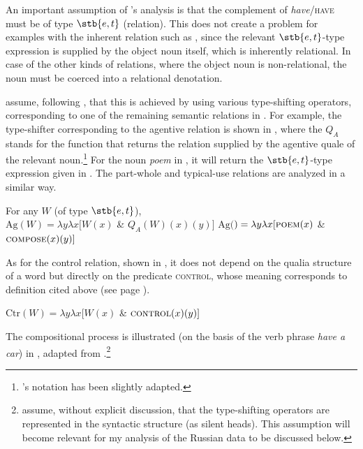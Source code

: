 \documentclass[output=paper,colorlinks,citecolor=brown]{langscibook}
\begin{document}
\noindent An important assumption of \citeauthor{Zaroukian.Beller2013}'s analysis is that the complement of \textit{have}/\textsc{have} must be of type $\stb{e,t}$ (relation). This does not create a problem for examples with the inherent relation such as , since the relevant $\stb{e,t}$-type expression is supplied by the object noun itself, which is inherently relational. In case of the other kinds of relations, where the object noun is non-relational, the noun must be coerced into a relational denotation.

\citet{Zaroukian.Beller2013} assume, following \citet{Vikner.Jensen2002}, that this is achieved by using various type-shifting operators, corresponding to one of the remaining semantic relations in . For example, the type-shifter corresponding to the agentive relation is shown in , where the $Q_A$ stands for the function that returns the relation supplied by the agentive quale of the relevant noun.\footnote{\citeauthor{Vikner.Jensen2002}'s notation has been slightly adapted.} For the noun \textit{poem} in , it will return the $\stb{e,t}$-type expression given in . The part-whole and typical-use relations are analyzed in a similar way.

    \largerpage[-1] %

\ea
\ea For any $W$ (of type $\stb{e,t}$),\\
$\text{Ag}(W) = \lambda y  \lambda x [W(x)$ \& $Q_A (W)(x)(y)]$  \label{agentive-shifter} \hfill
\citep[209]{Vikner.Jensen2002}
\ex $\text{Ag}($$) = \lambda y \lambda x [\textsc{poem}(x)$ \& $\textsc{compose}(x)(y)]$  \label{agentive-shifter-applied}
\z\z

\noindent As for the control relation, shown in , it does not depend on the qualia structure of a word but directly on the predicate \textsc{control}, whose meaning corresponds to  definition cited above (see page \pageref{ViknerJensen-control}).

\ea $\text{Ctr}(W) = \lambda y \lambda x [W(x)$ \& $\textsc{control}(x)(y)]$ \label{control-shifter} \hfill \citep[210]{Vikner.Jensen2002}
\z

\noindent The compositional process is illustrated (on the basis of the verb phrase \textit{have a car}) in , adapted from \citet{Zaroukian.Beller2013}.\footnote{\citeauthor{Zaroukian.Beller2013} assume, without explicit discussion, that the type-shifting operators are represented in the syntactic structure (as silent heads). This assumption will become relevant for my analysis of the Russian data to be discussed below.}
\end{document}
